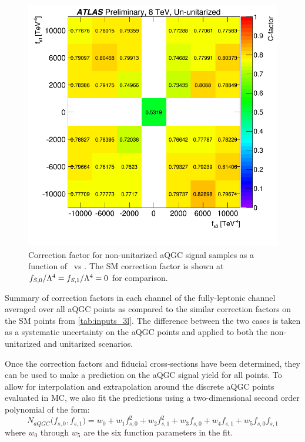 \begin{figure}[htb]
\centering
\includegraphics[width=.8\textwidth]{figures/aQGC/cfactor_chargesum.png}
\caption{Correction factor for non-unitarized aQGC signal samples as a function of \fszero~vs \fsone.
The SM correction factor is shown at $f_{S,0}/\Lambda^4=f_{S,1}/\Lambda^4=0$ for comparison.}
\label{fig:aqgc_cfactor_3l}
\end{figure}


\begin{table}[htb]
\centering

\caption{Summary of correction factors in each channel of the fully-leptonic channel 
averaged over all aQGC points as compared to the similar correction factors on the SM 
points from \tab\ref{tab:inputs_3l}. The difference between the two cases
is taken as a systematic uncertainty on the aQGC points and applied to both the 
non-unitarized and unitarized scenarios.}
\label{tab:aqgc_cfactor_3l_summary}
\end{table}

Once the correction factors and fiducial cross-sections have been determined,
they can be used to make a prediction on the aQGC signal yield 
for all points.  To allow for interpolation and extrapolation
around the discrete aQGC points evaluated in MC, we also 
fit the predictions using a two-dimensional second order polynomial of 
the form:
\begin{equation}
N_{aQGC}\big(f_{s,0},f_{s,1}\big) = w_0 + w_1 f_{s,0}^2 + w_2 f_{s,1}^2
+ w_3 f_{s,0} + w_4  f_{s,1} + w_5 f_{s,0} f_{s,1}
\end{equation}
where $w_0$ through $w_5$ are the six function parameters in the fit.




